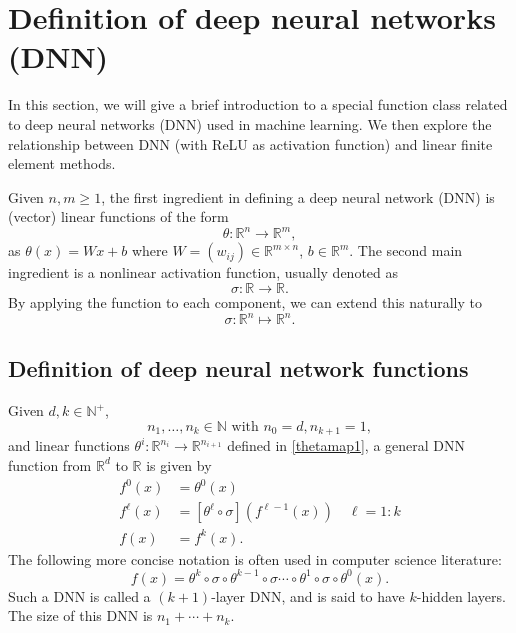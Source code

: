 \section{Definition of deep neural networks (DNN)} 
In this section, we will give a brief introduction to a special
function class related to deep neural networks (DNN) used in machine
learning.  We then explore the relationship between DNN (with ReLU as
activation function) and linear finite element methods. 

Given $n, m\ge 1$, the first ingredient in defining a deep neural
network (DNN) is (vector) linear functions of the form
\begin{equation}\label{thetamap1}
\theta:\mathbb{R}^{n}\to\mathbb{R}^{m} ,
\end{equation}as $\theta(x)=Wx+b$ where
$W=(w_{ij})\in\mathbb{R}^{m\times n}$, $b\in\mathbb{R}^{m}$. 
The second main ingredient is a nonlinear activation function, usually
denoted as 
\begin{equation}\label{sigma}
\sigma: \mathbb{R} \to \mathbb{R}.
\end{equation} 
By applying the function to each component, we can extend this
naturally to 
$$
\sigma:\mathbb R^{n}\mapsto \mathbb R^{n}.
$$

\subsection{Definition of deep neural network functions}\label{sec:DNN}
Given $d, k\in\mathbb{N}^+$, 
$$
n_1,\dots,n_{k}\in\mathbb{N} \mbox{ with }n_0=d, n_{k+1}=1, 
$$
 and  linear
functions $\theta^i: \mathbb{R}^{n_{i}}\to\mathbb{R}^{n_{i+1}}$ defined in \eqref{thetamap1}, a general DNN function from $\mathbb{R}^d$ to $\mathbb{R}$ is given by
\begin{align*}
f^0(x)   &=\theta^0(x) \\ 
f^{\ell}(x) &= [  \theta^{\ell} \circ \sigma ](f^{\ell-1}(x)) \quad \ell = 1:k \\
f(x) &= f^k(x). 
\end{align*}
The following more concise notation is often used in computer science literature:
\begin{equation}
\label{compress-dnn}
f(x) = \theta^{k}\circ \sigma \circ \theta^{k-1} \circ \sigma \cdots \circ \theta^1 \circ \sigma \circ \theta^0(x).
\end{equation}
Such a DNN is called a
$(k+1)$-layer DNN, and is said to have $k$-hidden layers. The size of
this DNN is $n_1+\cdots+n_k$.

